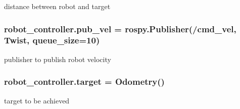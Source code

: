 distance between robot and target 

\subsubsection[{\texorpdfstring{pub\+\_\+vel}{pub_vel}}]{\setlength{\rightskip}{0pt plus 5cm}robot\+\_\+controller.\+pub\+\_\+vel = rospy.\+Publisher(\textquotesingle{}/cmd\+\_\+vel\textquotesingle{}, Twist, queue\+\_\+size=10)}\hypertarget{namespacerobot__controller_ac9cb673d888175b8d312b09650d380c9}{}\label{namespacerobot__controller_ac9cb673d888175b8d312b09650d380c9}


publisher to publish robot velocity 

\subsubsection[{\texorpdfstring{target}{target}}]{\setlength{\rightskip}{0pt plus 5cm}robot\+\_\+controller.\+target = Odometry()}\hypertarget{namespacerobot__controller_af6e678d9713033f52d7fb793cc429b98}{}\label{namespacerobot__controller_af6e678d9713033f52d7fb793cc429b98}


target to be achieved 

